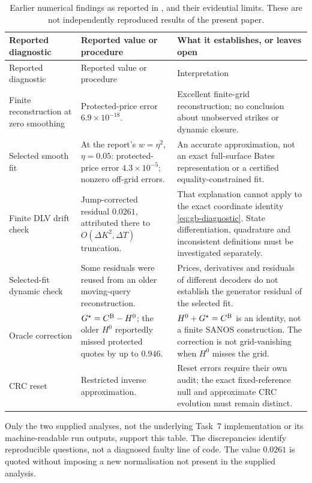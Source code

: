 \documentclass[11pt,a4paper]{article}
\numberwithin{equation}{section}
\theoremstyle{definition}\newtheorem{definition}[theorem]{Definition}
\theoremstyle{remark}\newtheorem{remark}[theorem]{Remark}
\begin{document}
\begin{longtable}{@{}p{}p{}p{}@{}}
\caption{Earlier numerical findings as reported in \cite{BatesCompatibility}, and their evidential limits. These are not independently reproduced results of the present paper.}\label{tab:bates-audit}\\
\toprule
Reported diagnostic & Reported value or procedure & What it establishes, or leaves open\\
\midrule\endfirsthead
\toprule Reported diagnostic & Reported value or procedure & Interpretation\\\midrule\endhead
Finite reconstruction at zero smoothing & Protected-price error $6.9\times10^{-18}$. & Excellent finite-grid reconstruction; no conclusion about unobserved strikes or dynamic closure.\\[3pt]
Selected smooth fit & At the report's $w=\eta^2$, $\eta=0.05$: protected-price error $4.3\times10^{-5}$; nonzero off-grid errors. & An accurate approximation, not an exact full-surface Bates representation or a certified equality-constrained fit.\\[3pt]
Finite DLV drift check & Jump-corrected residual $0.0261$, attributed there to $O(\Delta K^2,\Delta T)$ truncation. & That explanation cannot apply to the exact coordinate identity \eqref{eq:gb-diagnostic}. State differentiation, quadrature and inconsistent definitions must be investigated separately.\\[3pt]
Selected-fit dynamic check & Some residuals were reused from an older moving-query reconstruction. & Prices, derivatives and residuals of different decoders do not establish the generator residual of the selected fit.\\[3pt]
Oracle correction & $G^\star=C^{\rm B}-H^0$; the older $H^0$ reportedly missed protected quotes by up to $0.946$. & $H^0+G^\star=C^{\rm B}$ is an identity, not a finite SANOS construction. The correction is not grid-vanishing when $H^0$ misses the grid.\\[3pt]
CRC reset & Restricted inverse approximation. & Reset errors require their own audit; the exact fixed-reference null and approximate CRC evolution must remain distinct.\\
\bottomrule
\end{longtable}

Only the two supplied analyses, not the underlying Task~7 implementation or its machine-readable run outputs, support this table. The discrepancies identify reproducible questions, not a diagnosed faulty line of code. The value $0.0261$ is quoted without imposing a new normalisation not present in the supplied analysis.
\end{document}
